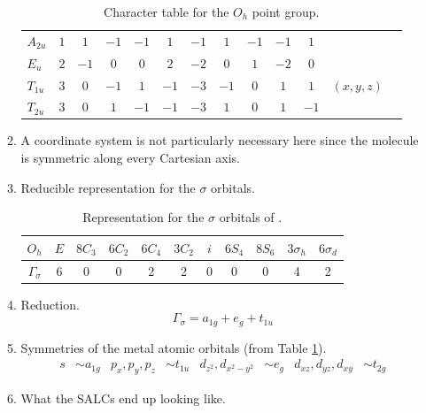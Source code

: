 \documentclass[../notes.tex]{subfiles}
\begin{document}
\begin{itemize}
\begin{enumerate}
\begin{table}[H]
\begin{tabular}{l|cccccccccc|l|l}
                $A_{2u}$ & $1$ & $1$  & $-1$ & $-1$ & $1$  & $-1$ & $1$  & $-1$ & $-1$ & $1$  & & \\
                $E_u$    & $2$ & $-1$ & $0$  & $0$  & $2$  & $-2$ & $0$  & $1$  & $-2$ & $0$  & & \\
                $T_{1u}$ & $3$ & $0$  & $-1$ & $1$  & $-1$ & $-3$ & $-1$ & $0$  & $1$  & $1$  & $(x,y,z)$ & \\
                $T_{2u}$ & $3$ & $0$  & $1$  & $-1$ & $-1$ & $-3$ & $1$  & $0$  & $1$  & $-1$ & & \\
            \end{tabular}
            \caption{Character table for the $O_h$ point group.}
            \label{tab:charTableOh}
        \end{table}
        \item A coordinate system is not particularly necessary here since the molecule is symmetric along every Cartesian axis.
        \item Reducible representation for the $\sigma$ orbitals.
        \begin{table}[H]
            \centering
            \small
            \renewcommand{\arraystretch}{1.2}
            \begin{tabular}{c|cccccccccc}
                $O_h$ & $E$ & $8C_3$ & $6C_2$ & $6C_4$ & $3C_2$ & $i$ & $6S_4$ & $8S_6$ & $3\sigma_h$ & $6\sigma_d$\\
                \hline
                $\Gamma_\sigma$ & 6 & 0 & 0 & 2 & 2 & 0 & 0 & 0 & 4 & 2\\
            \end{tabular}
            \caption{Representation for the $\sigma$ orbitals of .}
            \label{tab:ML6RR}
        \end{table}
        \item Reduction.
        \begin{equation*}
            \Gamma_\sigma = a_{1g}+e_g+t_{1u}
        \end{equation*}
        \item Symmetries of the metal atomic orbitals (from Table \ref{tab:charTableOh}).
        \begin{align*}
            s &\sim a_{1g}&
            p_x,p_y,p_z &\sim t_{1u}&
            d_{z^2},d_{x^2-y^2} &\sim e_g&
            d_{xz},d_{yz},d_{xy} &\sim t_{2g}
        \end{align*}
        \item What the SALCs end up looking like.
        \begin{figure}[h!]

\end{figure}
\end{enumerate}
\end{itemize}
\end{document}
